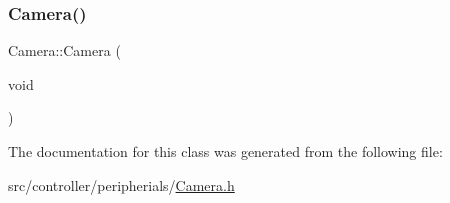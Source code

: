 \subsubsection{\texorpdfstring{Camera()}{Camera()}}
{\footnotesize\ttfamily Camera\+::\+Camera (\begin{DoxyParamCaption}\item[{void}]{ }\end{DoxyParamCaption})\hspace{0.3cm}{\ttfamily [inline]}}



The documentation for this class was generated from the following file\+:\begin{DoxyCompactItemize}
\item 
src/controller/peripherials/\hyperlink{Camera_8h}{Camera.\+h}\end{DoxyCompactItemize}
